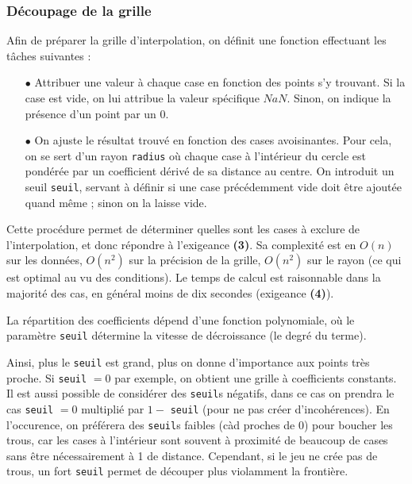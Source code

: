 \documentclass[12pt]{article}
\begin{document}
\subsubsection{Découpage de la grille}

    Afin de préparer la grille d'interpolation, on définit une fonction effectuant les tâches suivantes :

    \begin{enumerate}
        \item[$\bullet$] Attribuer une valeur à chaque case en fonction des points s'y trouvant. Si la case est vide, on lui attribue la valeur spécifique $NaN$. Sinon, on indique la présence d'un point par un $0$.
        \item[$\bullet$] On ajuste le résultat trouvé en fonction des cases avoisinantes. Pour cela, on se sert d'un rayon \texttt{radius} où chaque case à l'intérieur du cercle est pondérée par un coefficient dérivé de sa distance au centre. On introduit un seuil \texttt{seuil}, servant à définir si une case précédemment vide doit être ajoutée quand même ; sinon on la laisse vide.
    \end{enumerate}

    Cette procédure permet de déterminer quelles sont les cases à exclure de l'interpolation, et donc répondre à l'exigeance \textbf{(3)}. Sa complexité est en $O(n)$ sur les données, $O(n^{2})$ sur la précision de la grille, $O(n^{2})$ sur le rayon (ce qui est optimal au vu des conditions). Le temps de calcul est raisonnable dans la majorité des cas, en général moins de dix secondes (exigeance \textbf{(4)}).

    La répartition des coefficients dépend d'une fonction polynomiale, où le paramètre \texttt{seuil} détermine la vitesse de décroissance (le degré du terme).

    Ainsi, plus le \texttt{seuil} est grand, plus on donne d'importance aux points très proche. Si \texttt{seuil} $= 0$ par exemple, on obtient une grille à coefficients constants. Il est aussi possible de considérer des \texttt{seuil}s négatifs, dans ce cas on prendra le cas \texttt{seuil} $= 0$ multiplié par $1 -$ \texttt{seuil} (pour ne pas créer d'incohérences). En l'occurence, on préférera des \texttt{seuil}s faibles (càd proches de 0) pour boucher les trous, car les cases à l'intérieur sont souvent à proximité de beaucoup de cases sans être nécessairement à 1 de distance. Cependant, si le jeu ne crée pas de trous, un fort \texttt{seuil} permet de découper plus violamment la frontière.
\end{document}
